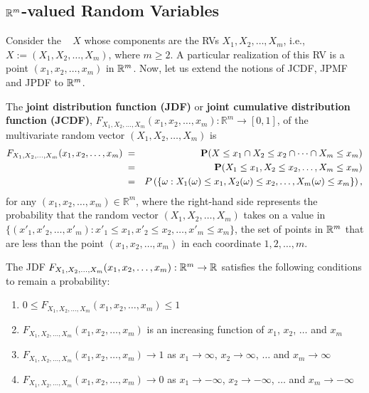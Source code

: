 \subsection{$\mathbb{R}^m$-valued Random Variables}

Consider the \rv~ $X$ whose components are the RVs $X_1,X_2,\ldots,X_m$, i.e., $X := (X_1,X_2,\ldots,X_m)$, where $m \geq 2$.  
A particular realization of this RV is a point $(x_1,x_2,\ldots,x_m)$ in $\mathbb{R}^m$.  
Now, let us extend the notions of JCDF, JPMF and JPDF to $\mathbb{R}^m$.  

\begin{definition}\label{Df:JmDF}
The {\bf joint distribution function (JDF)} or {\bf joint cumulative distribution function (JCDF)}, $F_{X_1,X_2,\ldots,X_m}(x_1,x_2,\ldots,x_m):\mathbb{R}^m\to [0,1]$, of the multivariate random vector $(X_1,X_2,\ldots,X_m)$ is
\begin{eqnarray}\label{E:jmDF}
F_{X_1,X_2,\ldots,X_m}(x_1,x_2,\ldots,x_m)\; 
&=& \mathbf{P}(X\leq x_1 \cap X_2 \leq x_2 \cap \cdots \cap X_m \leq x_m)\notag\\ 
&=& \mathbf{P}(X_1\leq x_1 , X_2 \leq x_2, \ldots, X_m \leq x_m)\\
&=& P\left( \{ \omega: X_1(\omega) \leq x_1, X_2(\omega) \leq x_2, \ldots, X_m(\omega) \leq x_m \} \right), \notag
\end{eqnarray}
for any $(x_1,x_2,\ldots,x_m) \in \mathbb{R}^m$, 
where the right-hand side represents the probability that the random vector $(X_1,X_2,\ldots,X_m)$ takes on a value in 
$\{(x'_1,x'_2,\ldots,x'_m): x'_1 \leq x_1, x'_2 \leq x_2, \ldots, x'_m \leq x_m\}$, the set of points in $\mathbb{R}^m$ that are less than the point $(x_1,x_2,\ldots,x_m)$ in each coordinate $1,2,\ldots,m$.
\end{definition}

The JDF $F_{X_1,X_2,\ldots,X_m}(x_1,x_2,\ldots,x_m):\mathbb{R}^m\to\mathbb{R}$ satisfies the following conditions to remain a probability: 
\begin{enumerate}
\item $0 \leq F_{X_1,X_2,\ldots,X_m}(x_1,x_2,\ldots,x_m) \leq 1$
\item $F_{X_1,X_2,\ldots,X_m}(x_1,x_2,\ldots,x_m)$ is an increasing function of $x_1$, $x_2$, $\ldots$ and $x_m$
\item $F_{X_1,X_2,\ldots,X_m}(x_1,x_2,\ldots,x_m) \to 1$ as $x_1\to \infty$, $x_2\to \infty$, $\ldots$ and $x_m\to \infty$
\item $F_{X_1,X_2,\ldots,X_m}(x_1,x_2,\ldots,x_m) \to 0$ as $x_1\to -\infty$, $x_2\to -\infty$, $\ldots$ and $x_m\to -\infty$
\end{enumerate}

